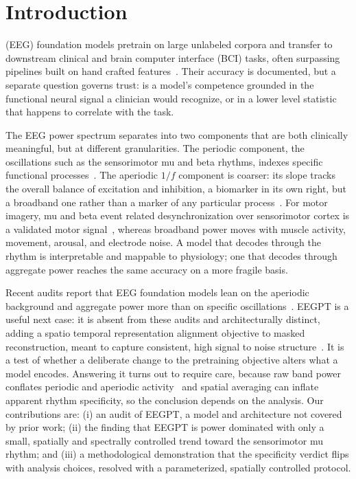 \documentclass[journal]{IEEEtran}
\begin{document}
\section{Introduction}
 (EEG) foundation models pretrain on
large unlabeled corpora and transfer to downstream clinical and brain computer
interface (BCI) tasks, often surpassing pipelines built on hand crafted
features~\cite{spectralbias2026}. Their accuracy is documented, but a separate
question governs trust: is a model's competence grounded in the functional
neural signal a clinician would recognize, or in a lower level statistic that
happens to correlate with the task.

The EEG power spectrum separates into two components that are both clinically
meaningful, but at different granularities. The periodic component, the
oscillations such as the sensorimotor mu and beta rhythms, indexes specific
functional processes~\cite{pfurtscheller1999erd}. The aperiodic $1/f$ component
is coarser: its slope tracks the overall balance of excitation and inhibition, a
biomarker in its own right, but a broadband one rather than a marker of any
particular process~\cite{donoghue2020specparam}. For motor imagery, mu and beta
event related desynchronization over sensorimotor cortex is a validated motor
signal~\cite{pfurtscheller1999erd}, whereas broadband power moves with muscle
activity, movement, arousal, and electrode noise. A model that decodes through
the rhythm is interpretable and mappable to physiology; one that decodes through
aggregate power reaches the same accuracy on a more fragile basis.

Recent audits report that EEG foundation models lean on the aperiodic background
and aggregate power more than on specific
oscillations~\cite{spectralbias2026,tang2026capture,beyondaccuracy2026,shama2026prism}.
EEGPT is a useful next case: it is absent from these audits and architecturally
distinct, adding a spatio temporal representation alignment objective to masked
reconstruction, meant to capture consistent, high signal to noise
structure~\cite{wang2024eegpt}. It is a test of whether a deliberate change to
the pretraining objective alters what a model encodes. Answering it turns out to
require care, because raw band power conflates periodic and aperiodic
activity~\cite{donoghue2020bandratio} and spatial averaging can inflate apparent
rhythm specificity, so the conclusion depends on the analysis. Our contributions
are: (i) an audit of EEGPT, a model and architecture not covered by prior work;
(ii) the finding that EEGPT is power dominated with only a small, spatially and
spectrally controlled trend toward the sensorimotor mu rhythm; and (iii) a
methodological demonstration that the specificity verdict flips with analysis
choices, resolved with a parameterized, spatially controlled protocol.
\end{document}
